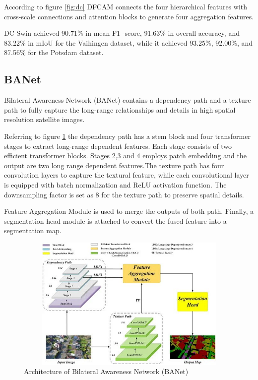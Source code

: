 According to figure \ref{fig:dc} DFCAM connects the four hierarchical features with cross-scale connections and attention blocks to generate four aggregation features. 

DC-Swin achieved 90.71\% in mean F1 -score, 91.63\% in overall accuracy, and 83.22\% in mIoU for the Vaihingen dataset, while it achieved 93.25\%, 92.00\%, and 87.56\% for the Potsdam dataset.

\subsection{BANet}
Bilateral Awareness Network (BANet) \cite{transformer-meet-conv} contains a dependency path and a texture path to fully capture the long-range relationships and details in high spatial resolution satellite images.

Referring to figure \ref{fig:banet} the dependency path has a stem block and four transformer stages to extract long-range dependent features. Each stage consists of two efficient transformer blocks. Stages 2,3 and 4 employs patch embedding and the output are two long range dependent features.The texture path has four convolution layers to capture the textural feature, while each convolutional layer is equipped with batch normalization and ReLU activation function. The downsampling factor is set as 8 for the texture path to preserve spatial details.


Feature Aggregation Module is used to merge the outputs of both path. Finally, a segmentation head module is attached to convert the fused feature into a segmentation map.

\FloatBarrier
\begin{figure}[ht]
\includegraphics[width=12.5cm, height=6.5cm]{images/banet.jpg}
\centering
\caption{Architecture of Bilateral Awareness Network (BANet)}
\label{fig:banet}
\end{figure}


